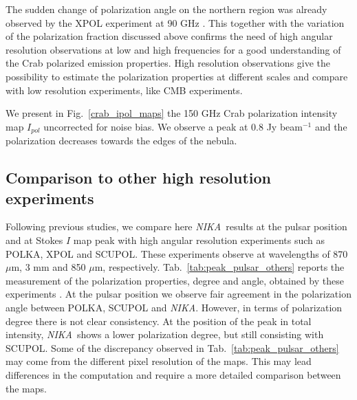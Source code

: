 \documentclass[twocolumn,traditabstract]{aa}
\def\NIKA{\textit{NIKA}}
\begin{document}
The sudden change of polarization angle on the northern region was already
observed by the XPOL experiment at 90 GHz \citep{aumont2010}.  This together
with the variation of the polarization fraction discussed above confirms the
need of high angular resolution observations at low and high frequencies for a
good understanding of the Crab polarized emission properties.
High resolution observations give the possibility to estimate the polarization properties at different scales and compare with low resolution experiments, like CMB experiments.

We present in Fig.~\ref{crab_ipol_maps} the 150 GHz Crab polarization intensity
map $I_{pol}$ uncorrected for noise bias. We observe a peak at 0.8 Jy beam$^{-1}$ and the polarization
decreases towards the edges of the nebula.

\subsection{Comparison to other high resolution experiments}
Following previous studies, we compare here \NIKA\ results at the pulsar position and at Stokes $I$ map peak with high angular resolution experiments such as POLKA, XPOL and SCUPOL. These experiments observe at wavelengths of 870 $\mu$m, 3 mm and 850 $\mu$m, respectively.
Tab.~\ref{tab:peak_pulsar_others} reports the measurement of the polarization properties, degree and angle, obtained by these experiments \citep{2014PASP..126.1027W}. 
At the pulsar position we observe fair agreement in the polarization angle between POLKA, SCUPOL and \NIKA. However, in terms of polarization degree there is not clear consistency. At the position of the peak in total intensity, \NIKA\ shows a lower polarization degree, but still consisting with SCUPOL. Some of the discrepancy observed in Tab.~\ref{tab:peak_pulsar_others} may come from the different pixel resolution of the maps. This may lead differences in the computation and require a more detailed comparison between the maps.
\end{document}
